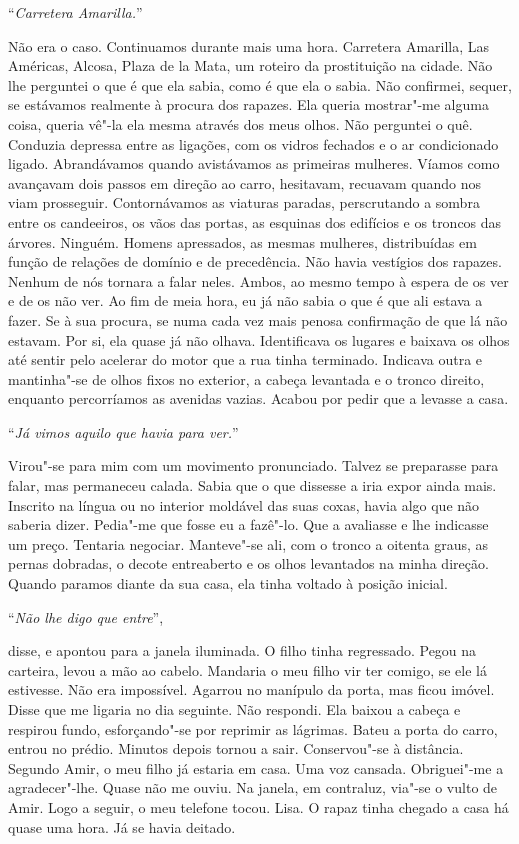 ``\emph{Carretera Amarilla.}''

Não era o caso. Continuamos durante mais uma hora. Carretera Amarilla,
Las Américas, Alcosa, Plaza de la Mata, um roteiro da prostituição na
cidade. Não lhe perguntei o que é que ela sabia, como é que ela o sabia.
Não confirmei, sequer, se estávamos realmente à procura dos rapazes. Ela
queria mostrar"-me alguma coisa, queria vê"-la ela mesma através dos
meus olhos. Não perguntei o quê. Conduzia depressa entre as ligações,
com os vidros fechados e o ar condicionado ligado. Abrandávamos quando
avistávamos as primeiras mulheres. Víamos como avançavam dois passos em
direção ao carro, hesitavam, recuavam quando nos viam prosseguir.
Contornávamos as viaturas paradas, perscrutando a sombra entre os
candeeiros, os vãos das portas, as esquinas dos edifícios e os troncos
das árvores. Ninguém. Homens apressados, as mesmas mulheres,
distribuídas em função de relações de domínio e de precedência. Não
havia vestígios dos rapazes. Nenhum de nós tornara a falar neles. Ambos,
ao mesmo tempo à espera de os ver e de os não ver. Ao fim de meia hora,
eu já não sabia o que é que ali estava a fazer. Se à sua procura, se
numa cada vez mais penosa confirmação de que lá não estavam. Por si, ela
quase já não olhava. Identificava os lugares e baixava os olhos até
sentir pelo acelerar do motor que a rua tinha terminado. Indicava outra
e mantinha"-se de olhos fixos no exterior, a cabeça levantada e o tronco
direito, enquanto percorríamos as avenidas vazias. Acabou por pedir que
a levasse a casa.

``\emph{Já vimos aquilo que havia para ver.}''

Virou"-se para mim com um movimento pronunciado. Talvez se preparasse
para falar, mas permaneceu calada. Sabia que o que dissesse a iria expor
ainda mais. Inscrito na língua ou no interior moldável das suas coxas,
havia algo que não saberia dizer. Pedia"-me que fosse eu a fazê"-lo. Que
a avaliasse e lhe indicasse um preço. Tentaria negociar. Manteve"-se
ali, com o tronco a oitenta graus, as pernas dobradas, o decote
entreaberto e os olhos levantados na minha direção. Quando paramos
diante da sua casa, ela tinha voltado à posição inicial.

``\emph{Não lhe digo que entre}'',

disse, e apontou para a janela iluminada. O filho tinha regressado.
Pegou na carteira, levou a mão ao cabelo. Mandaria o meu filho vir ter
comigo, se ele lá estivesse. Não era impossível. Agarrou no manípulo da
porta, mas ficou imóvel. Disse que me ligaria no dia seguinte. Não
respondi. Ela baixou a cabeça e respirou fundo, esforçando"-se por
reprimir as lágrimas. Bateu a porta do carro, entrou no prédio. Minutos
depois tornou a sair. Conservou"-se à distância. Segundo Amir, o meu
filho já estaria em casa. Uma voz cansada. Obriguei"-me a
agradecer"-lhe. Quase não me ouviu. Na janela, em contraluz, via"-se o
vulto de Amir. Logo a seguir, o meu telefone tocou. Lisa. O rapaz tinha
chegado a casa há quase uma hora. Já se havia deitado.

